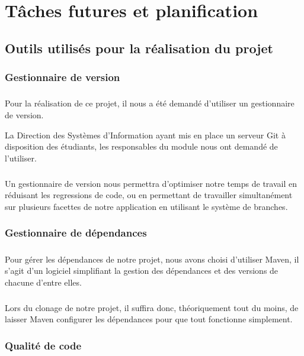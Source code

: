 \chapter{Tâches futures et planification}

\section{Outils utilisés pour la réalisation du projet}
\subsection{Gestionnaire de version}
\paragraph{}
Pour la réalisation de ce projet, il nous a été demandé d'utiliser un gestionnaire de version.

La Direction des Systèmes d'Information ayant mis en place un serveur Git à disposition des étudiants, les responsables du module nous ont demandé de l'utiliser.

\paragraph{}
Un gestionnaire de version nous permettra d'optimiser notre temps de travail en réduisant les regressions de code, ou en permettant de travailler simultanément sur plusieurs facettes de notre application en utilisant le système de branches.

\subsection{Gestionnaire de dépendances}
\paragraph{}
Pour gérer les dépendances de notre projet, nous avons choisi d'utiliser Maven, il s'agit d'un logiciel simplifiant la gestion des dépendances et des versions de chacune d'entre elles.

\paragraph{}
Lors du clonage de notre projet, il suffira donc, théoriquement tout du moins, de laisser Maven configurer les dépendances pour que tout fonctionne simplement.

\subsection{Qualité de code}
